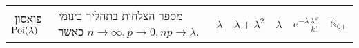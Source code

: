 \documentclass[8pt,twocolumn]{extarticle}
\begin{document}
{{\begin{minipage}{\columnwidth}
\begin{sideways}
\begin{tabular}{ R{1.8cm} | R{2.8cm} | c | C{2cm} | c | C{2.1cm} | C{1.5cm}}
          פואסון \hspace*{\fill}‏ ‎\(\operatorname{Poi}(\lambda)\)
                   & מספר הצלחות בתהליך בינומי כאשר ‎\(n\to \infty , p\to 0, n p\to \lambda \).
          & ‎\(\lambda \)
                  & ‎\(\lambda + \lambda^2\)
                            & ‎\(\lambda\)
                                     & ‎\(e^{-\lambda} \frac{\lambda^k}{k!}\)
                                                  & ‎\(\mathbb{N}_{0+}\)
        \end{tabular}
\end{sideways}
\end{minipage}}}
\fi
\end{document}
